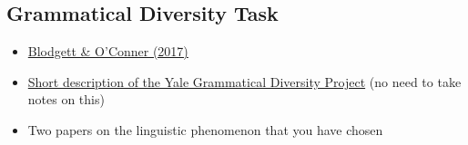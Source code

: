 \documentclass[12pt,table]{article}
\begin{document}
\subsection*{Grammatical Diversity Task}

\begin{itemize}
\item \href{https://arxiv.org/pdf/1707.00061.pdf}{Blodgett \& O'Conner (2017)}
\item \href{https://news.yale.edu/2015/04/17/project-explores-marvelously-diverse-ways-we-speak-english}{Short description of the Yale Grammatical Diversity Project} (no need to take notes on this)
\item Two papers on the linguistic phenomenon that you have chosen
\end{itemize}
\end{document}
